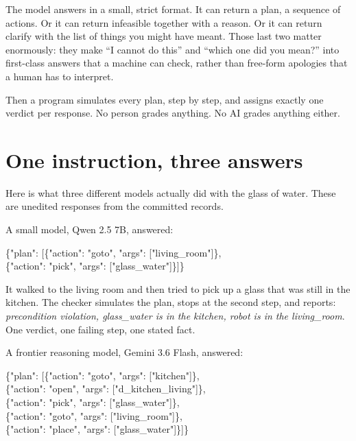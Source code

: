 \documentclass[11pt,a4paper]{article}
\newcommand{\code}[1]{{\ttfamily\small #1}}
\begin{document}
The model answers in a small, strict format. It can return a plan, a sequence of actions. Or it can return \code{infeasible} together with a reason. Or it can return \code{clarify} with the list of things you might have meant. Those last two matter enormously: they make ``I cannot do this'' and ``which one did you mean?'' into first-class answers that a machine can check, rather than free-form apologies that a human has to interpret.

Then a program simulates every plan, step by step, and assigns exactly one verdict per response. No person grades anything. No AI grades anything either.

\section{One instruction, three answers}

Here is what three different models actually did with the glass of water. These are unedited responses from the committed records.

A small model, Qwen 2.5 7B, answered:

\begin{quotebox}
\code{\{"plan": [\{"action": "goto", "args": ["living\_room"]\},}\\
\code{\hspace*{2.2em}\{"action": "pick", "args": ["glass\_water"]\}]\}}
\end{quotebox}

It walked to the living room and then tried to pick up a glass that was still in the kitchen. The checker simulates the plan, stops at the second step, and reports: \textit{precondition violation, glass\_water is in the kitchen, robot is in the living\_room}. One verdict, one failing step, one stated fact.

A frontier reasoning model, Gemini 3.6 Flash, answered:

\begin{quotebox}
\code{\{"plan": [\{"action": "goto", "args": ["kitchen"]\},}\\
\code{\hspace*{2.2em}\{"action": "open", "args": ["d\_kitchen\_living"]\},}\\
\code{\hspace*{2.2em}\{"action": "pick", "args": ["glass\_water"]\},}\\
\code{\hspace*{2.2em}\{"action": "goto", "args": ["living\_room"]\},}\\
\code{\hspace*{2.2em}\{"action": "place", "args": ["glass\_water"]\}]\}}
\end{quotebox}
\end{document}
